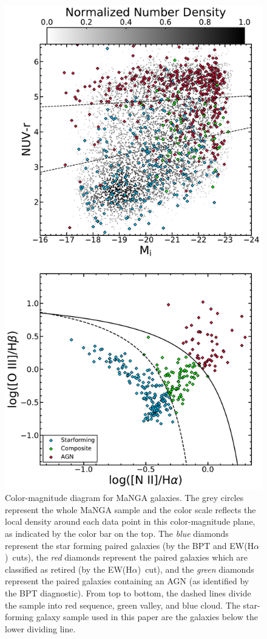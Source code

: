 \documentclass[iop,revtex4,twocolumn,apj,numberedappendix,appendixfloats]{emulateapj}
\newcommand{\ewha}{EW(H$\alpha$)}
\begin{document}
\begin{figure}
\centering
\includegraphics[width=\linewidth]{fig/bpt-cmd.pdf}
\caption[]{Color-magnitude diagram for MaNGA galaxies. The grey circles represent the whole MaNGA sample and the color scale reflects the local density around each data point in this color-magnitude plane, as indicated by the color bar on the top. The {\it blue} diamonds represent the star forming paired galaxies (by the BPT and \ewha\ cuts), the {\it red} diamonds represent the paired galaxies which are classified as retired (by the \ewha\ cut), and the {\it green} diamonds represent the paired galaxies containing an AGN (as identified by the BPT diagnostic). From top to bottom, the dashed lines divide the sample into red sequence, green valley, and blue cloud. The star-forming galaxy sample used in this paper are the galaxies below the lower dividing line.}
\label{fig:cmd}
\end{figure}
\end{document}
